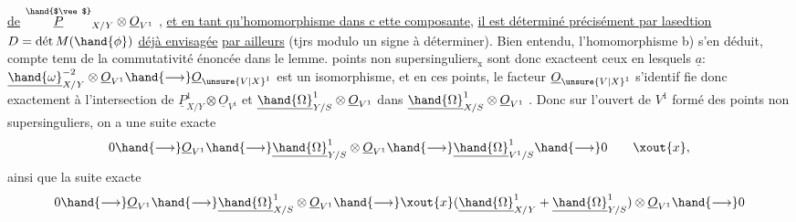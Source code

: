 
\uline{de} $\overset{\hand{$\vee$}}{\underline{P}}_{X/Y}\otimes\underline{O}_{V^1}$ , \uline{et en tant qu'homomorphisme dans c ette composante,}
\uline{il est déterminé précisément par lasedtion} $D = \text{dét}\,M(\hand{\phi})$ \uline{déjà envisagée}
\uline{par ailleurs} (tjrs modulo un signe à déterminer). Bien entendu,
l'homomorphisme b) s'en déduit, compte tenu de la commutativité énoncée
dans le lemme.  points non supersinguliers$_{\text{x}}$ sont donc exacteent
ceux en lesquels $\underline{a}$: $\underline{\hand{\omega}}^{-2}_{X/Y}\otimes\underline{O}_{V^1}\hand{\longrightarrow}\underline{O}_{\unsure{V|X}^1}$ est un isomorphisme, et en
ces points,  le facteur $\underline{O}_{\unsure{V|X}^1}$ s'identif
fie donc exactement à l'intersection de $\underline{P}^1_{X/Y}\otimes\underline{O}_{V^1}$ et $\underline{\hand{\Omega}}^1_{Y/S}\otimes\underline{O}_{V^1}$
dans $\underline{\hand{\Omega}}^1_{X/S}\otimes\underline{O}_{V^1}$ . Donc sur l'ouvert de $V^1$ formé des points non
supersinguliers, on a une suite exacte
\[ 0\hand{\longrightarrow}\underline{O}_{V^1}\hand{\longrightarrow}\underline{\hand{\Omega}}^1_{Y/S}\otimes\underline{O}_{V^1}\hand{\longrightarrow}\underline{\hand{\Omega}}^1_{V^1/S}\hand{\longrightarrow} 0 \qquad \xout{x}, \]
ainsi que la suite exacte
\[ 0\hand{\longrightarrow}\underline{O}_{V^1}\hand{\longrightarrow}\underline{\hand{\Omega}}^1_{X/S}\otimes\underline{O}_{V^1}\hand{\longrightarrow}\xout{x}(\underline{\hand{\Omega}}^1_{X/Y}+\underline{\hand{\Omega}}^1_{Y/S})\otimes\underline{O}_{V^1}\hand{\longrightarrow} 0 \]

